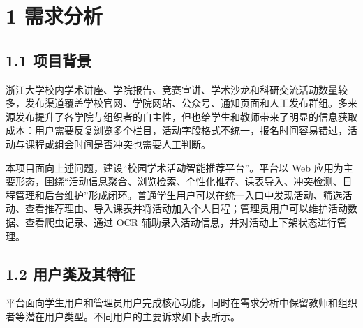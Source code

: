 \section{1 需求分析}\label{ux9700ux6c42ux5206ux6790}

\subsection{1.1 项目背景}\label{ux9879ux76eeux80ccux666f}

浙江大学校内学术讲座、学院报告、竞赛宣讲、学术沙龙和科研交流活动数量较多，发布渠道覆盖学校官网、学院网站、公众号、通知页面和人工发布群组。多来源发布提升了各学院与组织者的自主性，但也给学生和教师带来了明显的信息获取成本：用户需要反复浏览多个栏目，活动字段格式不统一，报名时间容易错过，活动与课程或组会时间是否冲突也需要人工判断。

本项目面向上述问题，建设``校园学术活动智能推荐平台''。平台以 Web
应用为主要形态，围绕``活动信息聚合、浏览检索、个性化推荐、课表导入、冲突检测、日程管理和后台维护''形成闭环。普通学生用户可以在统一入口中发现活动、筛选活动、查看推荐理由、导入课表并将活动加入个人日程；管理员用户可以维护活动数据、查看爬虫记录、通过
OCR 辅助录入活动信息，并对活动上下架状态进行管理。

\subsection{1.2
用户类及其特征}\label{ux7528ux6237ux7c7bux53caux5176ux7279ux5f81}

平台面向学生用户和管理员用户完成核心功能，同时在需求分析中保留教师和组织者等潜在用户类型。不同用户的主要诉求如下表所示。

